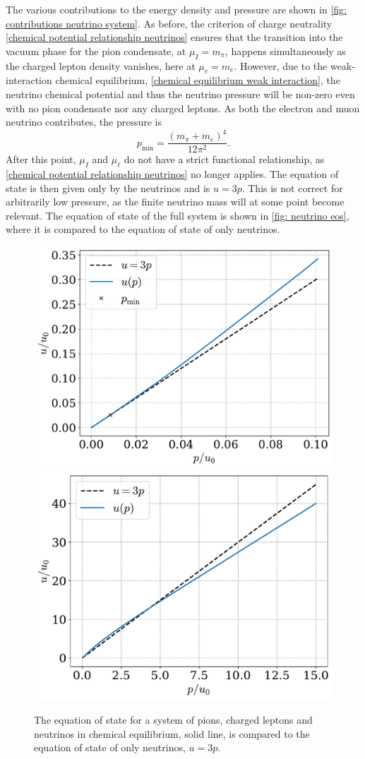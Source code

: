 The various contributions to the energy density and pressure are shown in \autoref{fig: contributions neutrino system}.
As before, the criterion of charge neutrality \autoref{chemical potential relationship neutrinos} ensures that the transition into the vacuum phase for the pion condensate, at $\mu_I = m_\pi$, happens simultaneously as the charged lepton density vanishes, here at $\mu_e = m_e$.
However, due to the weak-interaction chemical equilibrium, \autoref{chemical equilibrium weak interaction}, the neutrino chemical potential and thus the neutrino pressure will be non-zero even with no pion condensate nor any charged leptons. 
As both the electron and muon neutrino contributes, the pressure is
%
\begin{equation}
    \label{p min}
    p_\text{min} = \frac{(m_\pi+m_e)^4}{12 \pi^2}.
\end{equation}
%
After this point, $\mu_I$ and $\mu_\ell$ do not have a strict functional relationship, as \autoref{chemical potential relationship neutrinos} no longer applies.
The equation of state is then given only by the neutrinos and is $u = 3p$.
This is not correct for arbitrarily low pressure, as the finite neutrino mass will at some point become relevant.
The equation of state of the full system is shown in \autoref{fig: neutrino eos}, where it is compared to the equation of state of only neutrinos.

\begin{figure}[!htb]
    \centering
    \includegraphics[width=.5\textwidth]{../scripts/figurer/neutrino_eos2.pdf}
    \includegraphics[width=.49\textwidth]{../scripts/figurer/neutrino_eos.pdf}
    \caption{
        The equation of state for a system of pions, charged leptons and neutrinos in chemical equilibrium, solid line, is compared to the equation of state of only neutrinos, $u = 3 p$.
    }
    \label{fig: neutrino eos}
\end{figure}

